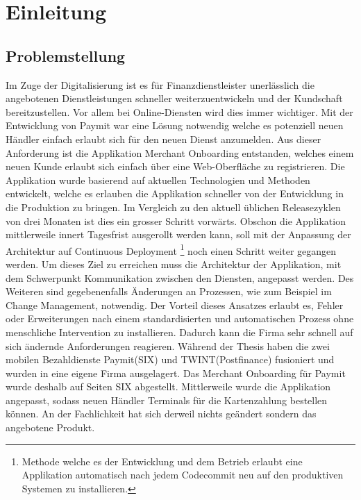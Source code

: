 \chapter{Einleitung}

\section{Problemstellung}

Im Zuge der Digitalisierung ist es für Finanzdienstleister unerlässlich die angebotenen Dienstleistungen schneller weiterzuentwickeln und der Kundschaft bereitzustellen. Vor allem bei Online-Diensten wird dies immer wichtiger. Mit der Entwicklung von Paymit war eine Lösung notwendig welche es potenziell neuen Händler einfach erlaubt sich für den neuen Dienst anzumelden. Aus dieser Anforderung ist die Applikation Merchant Onboarding entstanden, welches einem neuen Kunde erlaubt sich einfach über eine Web-Oberfläche zu registrieren. \newline
Die Applikation wurde basierend auf aktuellen Technologien und Methoden entwickelt, welche es erlauben die Applikation schneller von der Entwicklung in die Produktion zu bringen. Im Vergleich zu den aktuell üblichen Releasezyklen von drei Monaten ist dies ein grosser Schritt vorwärts.\newline
Obschon die Applikation mittlerweile innert Tagesfrist ausgerollt werden kann, soll mit der Anpassung der Architektur auf Continuous Deployment \footnote{Methode welche es der Entwicklung und dem Betrieb erlaubt eine Applikation automatisch nach jedem Codecommit neu auf den produktiven Systemen zu installieren.} noch einen Schritt weiter gegangen werden. Um dieses Ziel zu erreichen muss die Architektur der Applikation, mit dem Schwerpunkt Kommunikation zwischen den Diensten, angepasst werden. Des Weiteren sind gegebenenfalls Änderungen an Prozessen, wie zum Beispiel im Change Management, notwendig.
Der Vorteil dieses Ansatzes erlaubt es, Fehler oder Erweiterungen nach einem standardisierten und automatischen Prozess ohne menschliche Intervention zu installieren. Dadurch kann die Firma sehr schnell auf sich ändernde Anforderungen reagieren.\newline
Während der Thesis haben die zwei mobilen Bezahldienste Paymit(SIX) und TWINT(Postfinance) fusioniert und wurden in eine eigene Firma ausgelagert. Das Merchant Onboarding für Paymit wurde deshalb auf Seiten SIX abgestellt. Mittlerweile wurde die Applikation angepasst, sodass neuen Händler Terminals für die Kartenzahlung bestellen können. An der Fachlichkeit hat sich derweil nichts geändert sondern das angebotene Produkt.\newline

